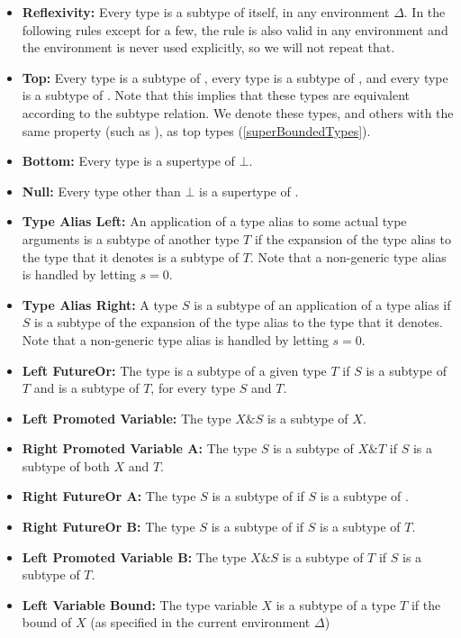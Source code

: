 \documentclass[makeidx]{article}
\begin{document}
{{  \def\Item#1#2{\item[#1]{\textbf{#2:}}}
  \begin{itemize}
  \Item{\SrnReflexivity}{Reflexivity}
    Every type is a subtype of itself, in any environment $\Delta$.
    In the following rules except for a few,
    the rule is also valid in any environment
    and the environment is never used explicitly,
    so we will not repeat that.
  \Item{\SrnTop}{Top}
    Every type is a subtype of ,
    every type is a subtype of \DYNAMIC,
    and every type is a subtype of \VOID.
    Note that this implies that these types are equivalent
    according to the subtype relation.
    We denote these types,
    and others with the same property (such as ),
    as top types
    (\ref{superBoundedTypes}).
  \Item{\SrnBottom}{Bottom}
    Every type is a supertype of $\bot$.
  \Item{\SrnNull}{Null}
    Every type other than $\bot$ is a supertype of .
  \Item{\SrnLeftTypeAlias}{Type Alias Left}
    An application of a type alias to some actual type arguments is
    a subtype of another type $T$
    if the expansion of the type alias to the type that it denotes
    is a subtype of $T$.
    Note that a non-generic type alias is handled by letting $s = 0$.
  \Item{\SrnRightTypeAlias}{Type Alias Right}
    A type $S$ is a subtype of an application of a type alias
    if $S$ is a subtype of
    the expansion of the type alias to the type that it denotes.
    Note that a non-generic type alias is handled by letting $s = 0$.
  \Item{\SrnLeftFutureOr}{Left FutureOr}
    The type  is a subtype of a given type $T$
    if $S$ is a subtype of $T$ and  is a subtype of $T$,
    for every type $S$ and $T$.
  \Item{\SrnTypeVariableReflexivityA}{Left Promoted Variable}
    The type $X \& S$ is a subtype of $X$.
  \Item{\SrnRightPromotedVariable}{Right Promoted Variable A}
    The type $S$ is a subtype of $X \& T$ if
    $S$ is a subtype of both $X$ and $T$.
  \Item{\SrnRightFutureOrA}{Right FutureOr A}
    The type $S$ is a subtype of  if
    $S$ is a subtype of .
  \Item{\SrnRightFutureOrB}{Right FutureOr B}
    The type $S$ is a subtype of  if
    $S$ is a subtype of $T$.
  \Item{\SrnLeftPromotedVariable}{Left Promoted Variable B}
    The type $X \& S$ is a subtype of $T$ if
    $S$ is a subtype of $T$.
  \Item{\SrnLeftVariableBound}{Left Variable Bound}
    The type variable $X$ is a subtype of a type $T$ if
    the bound of $X$
    (as specified in the current environment $\Delta$)

\end{itemize}}}
\end{document}
